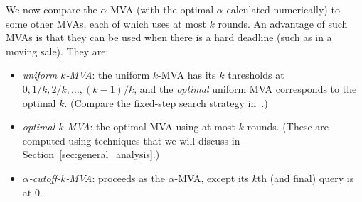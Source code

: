 
We now compare the $\alpha$-MVA (with the optimal $\alpha$ calculated
numerically) to some other MVAs, each of which uses at most $k$ rounds.
An advantage of such MVAs is that they can be used when there is a hard
deadline (such as in a moving sale).
They are:

\begin{itemize}
\item {\em uniform $k$-MVA}:  the uniform $k$-MVA has its $k$
  thresholds at $0, 1/k, 2/k, \ldots, (k-1)/k$, and the {\em optimal} uniform MVA
  corresponds to the optimal $k$.  (Compare the fixed-step search strategy in~\cite{SarneSR2010:IncreasingSearch,DBLP:conf/iwdc/HassanJ04}.)
\item {\em optimal $k$-MVA}: the optimal MVA using at most $k$ rounds.
  (These are computed using techniques that we will discuss in Section~\ref{sec:general_analysis}.)
\item {\em $\alpha$-cutoff-$k$-MVA}: proceeds as the $\alpha$-MVA, except
  its $k$th (and final) query is at $0$.
\end{itemize}






